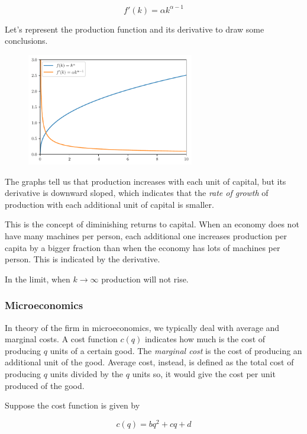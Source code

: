 \documentclass[a4paper,11pt]{article}
\theoremstyle{definition}
\theoremstyle{plain}
\begin{document}
\[
f'(k) = \alpha k^{\alpha-1}
\]

Let's represent the production function and its derivative to draw some
conclusions.

    \begin{figure}[htbp]
    	\centering 
    		\includegraphics[width = 0.65\textwidth]{Ch2_files/Ch2_7_0.pdf}
    \end{figure}
    
    The graphs tell us that production increases with each unit of capital,
but its derivative is downward sloped, which indicates that the
\emph{rate of growth} of production with each additional unit of capital
is smaller.

This is the concept of diminishing returns to capital. When an economy
does not have many machines per person, each additional one increases
production per capita by a bigger fraction than when the economy has
lots of machines per person. This is indicated by the derivative.

In the limit, when \(k\rightarrow\infty\) production will not rise.

\subsubsection{Microeconomics}\label{microeconomics}

In theory of the firm in microeconomics, we typically deal with average
and marginal costs. A cost function \(c(q)\) indicates how much is the
cost of producing \(q\) units of a certain good. The \emph{marginal
cost} is the cost of producing an additional unit of the good. Average
cost, instead, is defined as the total cost of producing \(q\) units
divided by the \(q\) units so, it would give the cost per unit produced
of the good.

Suppose the cost function is given by

\[
c(q) = bq^2 + cq + d
\]
\end{document}
